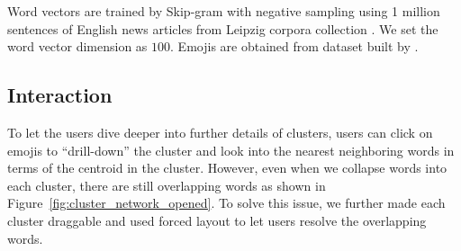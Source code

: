 Word vectors are trained by Skip-gram with negative sampling \cite{NIPS2013_5021} using 1 million sentences of English news articles from Leipzig corpora collection \cite{Goldhahn12buildinglarge}. We set the word vector dimension as $100$. 
Emojis are obtained from dataset built by \cite{eisner-EtAl:2016:SocialNLP}. 


\subsection{Interaction}
To let the users dive deeper into further details of clusters, users can click on emojis to ``drill-down'' \cite{Elmqvist:2010:HAI:1749404.1749525} the cluster and look into the nearest neighboring words in terms of the centroid in the cluster.
However, even when we collapse words into each cluster, there are still overlapping words as shown in Figure~\ref{fig:cluster_network_opened}. 
To solve this issue, we further made each cluster draggable and used forced layout to let users resolve the overlapping words. 

